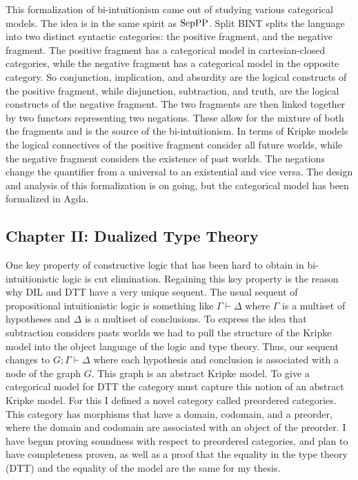 This formalization of bi-intuitionism came out of studying various
categorical models.  The idea is in the same spirit as $\text{SepPP}$. Split
BINT splits the language into two distinct syntactic categories: the
positive fragment, and the negative fragment. The positive fragment
has a categorical model in cartesian-closed categories, while the
negative fragment has a categorical model in the opposite category.
So conjunction, implication, and absurdity are the logical constructs of
the positive fragment, while disjunction, subtraction, and truth, are
the logical constructs of the negative fragment.  The two fragments are
then linked together by two functors representing two negations.
These allow for the mixture of both the fragments and is the source of
the bi-intuitionism.  In terms of Kripke models the logical
connectives of the positive fragment consider all future worlds, while
the negative fragment considers the existence of past worlds.  The
negations change the quantifier from a universal to an existential and
vice versa.  The design and analysis of this formalization is on
going, but the categorical model has been formalized in Agda.

\subsection{Chapter II: Dualized Type Theory}
\label{subsubsec:dualized_type_theory}
One key property of constructive logic that has been hard to obtain in
bi-intuitionistic logic is cut elimination.  Regaining this key
property is the reason why DIL and DTT have a very unique sequent.
The usual sequent of propositional intuitionistic logic is something
like $\Gamma \vdash \Delta$ where $\Gamma$ is a multiset of hypotheses
and $\Delta$ is a multiset of conclusions.  To express the idea that
subtraction considers pasts worlds we had to pull the structure of the
Kripke model into the object language of the logic and type theory.
Thus, our sequent changes to $G ; \Gamma \vdash \Delta$ where each
hypothesis and conclusion is associated with a node of the graph $G$.
This graph is an abstract Kripke model.  To give a categorical model
for DTT the category must capture this notion of an abstract Kripke
model.  For this I defined a novel category called preordered
categories.  This category has morphisms that have a domain, codomain,
and a preorder, where the domain and codomain are associated with an
object of the preorder.  I have begun proving soundness with respect
to preordered categories, and plan to have completeness proven, as
well as a proof that the equality in the type theory (DTT) and the
equality of the model are the same for my thesis.

